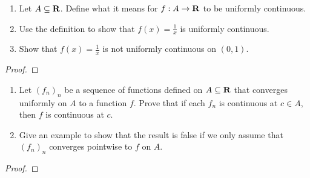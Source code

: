 \documentclass[11pt,twoside,openany]{memoir}
\begin{document}
\newpage
\fancyhead[L]{\scalebox{0.9}{Continuity}}
\fancyhead[R]{\scalebox{0.9}{Appeared on: F18}}
\begin{problem}
    \phantom{a}
    \begin{enumerate}[label = (\arabic*)]
        \item Let $A \subseteq \mathbf{R}$. Define what it means for $f:A \rightarrow \mathbf{R}$ to be uniformly continuous.
        \item Use the definition to show that $f(x) = \frac{1}{x}$ is uniformly continuous.
        \item Show that $f(x) = \frac{1}{x}$ is not uniformly continuous on $(0,1)$.
    \end{enumerate}
\end{problem}
\begin{proof}
\end{proof}

\newpage
\fancyhead[L]{\scalebox{0.9}{Continuity}}
\fancyhead[R]{\scalebox{0.9}{Appeared on: S18}}
\begin{problem}
    \phantom{a}
    \begin{enumerate}[label = (\arabic*)]
        \item Let $(f_n)_n$ be a sequence of functions defined on $A \subseteq \mathbf{R}$ that converges uniformly on $A$ to a function $f$. Prove that if each $f_n$ is continuous at $c \in A$, then $f$ is continuous at $c$.
        \item Give an example to show that the result is false if we only assume that $(f_n)_n$ converges pointwise to $f$ on $A$.
    \end{enumerate}
\end{problem}
\begin{proof}
\end{proof}
\end{document}
